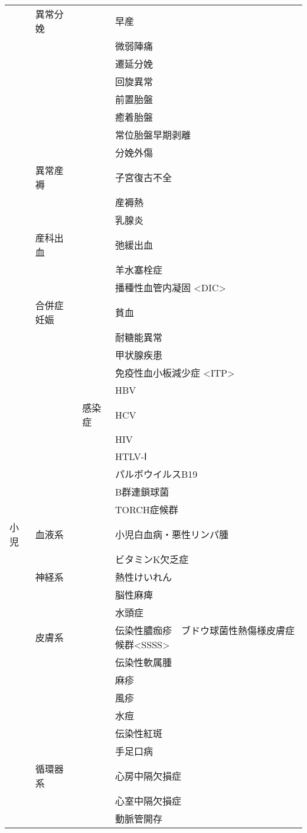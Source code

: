 \begin{xltabular}{\linewidth}{XXXX}
 & 異常分娩 &  & 早産 \\
 &  &  & 微弱陣痛 \\
 &  &  & 遷延分娩 \\
 &  &  & 回旋異常 \\
 &  &  & 前置胎盤 \\
 &  &  & 癒着胎盤 \\
 &  &  & 常位胎盤早期剥離 \\
 &  &  & 分娩外傷 \\
 & 異常産褥 &  & 子宮復古不全 \\
 &  &  & 産褥熱 \\
 &  &  & 乳腺炎 \\
 & 産科出血 &  & 弛緩出血 \\
 &  &  & 羊水塞栓症 \\
 &  &  & 播種性血管内凝固 <DIC>  \\
 & 合併症妊娠 &  & 貧血 \\
 &  &  & 耐糖能異常 \\
 &  &  & 甲状腺疾患 \\
 &  &  & 免疫性血小板減少症 <ITP> \\
 &  &  & HBV \\
 &  & 感染症 & HCV \\
 &  &  & HIV \\
 &  &  & HTLV-Ⅰ \\
 &  &  & パルボウイルスB19 \\
 &  &  & B群連鎖球菌 \\
 &  &  & TORCH症候群 \\
小児 & 血液系 &  & 小児白血病・悪性リンパ腫 \\
 &  &  & ビタミンK欠乏症 \\
 & 神経系 &  & 熱性けいれん \\
 &  &  & 脳性麻痺 \\
 &  &  & 水頭症 \\
 & 皮膚系 &  & 伝染性膿痂疹　ブドウ球菌性熱傷様皮膚症候群<SSSS> \\
 &  &  & 伝染性軟属腫 \\
 &  &  & 麻疹 \\
 &  &  & 風疹 \\
 &  &  & 水痘 \\
 &  &  & 伝染性紅斑 \\
 &  &  & 手足口病 \\
 & 循環器系 &  & 心房中隔欠損症 \\
 &  &  & 心室中隔欠損症 \\
 &  &  & 動脈管開存 \\

\end{xltabular}
